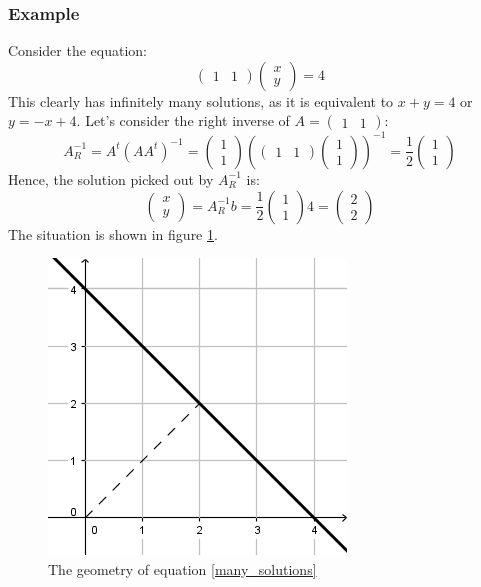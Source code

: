 \documentclass[12pt, a4paper]{article}
\numberwithin{equation}{section}
\begin{document}
\subsubsection{Example}
Consider the equation:
\begin{equation}
\label{many_solutions}
\begin{pmatrix}1 & 1\end{pmatrix}\begin{pmatrix}x \\ y\end{pmatrix}=4
\end{equation}
This clearly has infinitely many solutions, as it is equivalent to $x+y=4$ or $y=-x+4$. Let's consider the right inverse of $A=\begin{pmatrix}1 & 1\end{pmatrix}$:
\begin{equation}
A^{-1}_R=A^t(AA^t)^{-1}=\begin{pmatrix}1 \\ 1\end{pmatrix}\left(\begin{pmatrix}1 & 1\end{pmatrix}\begin{pmatrix}1 \\ 1\end{pmatrix}\right)^{-1}=\frac{1}{2}\begin{pmatrix}1 \\ 1\end{pmatrix}
\end{equation}
Hence, the solution picked out by $A^{-1}_R$ is:
\begin{equation}
\begin{pmatrix}x \\ y\end{pmatrix}=A^{-1}_R b=\frac{1}{2}\begin{pmatrix}1 \\ 1\end{pmatrix}4=\begin{pmatrix}2 \\ 2\end{pmatrix}
\end{equation}
The situation is shown in figure \ref{fig:right_inverse}.

\begin{figure}
\centering
\includegraphics{right_inverse}
\caption{The geometry of equation \ref{many_solutions}}
\label{fig:right_inverse}
\end{figure}
\end{document}
